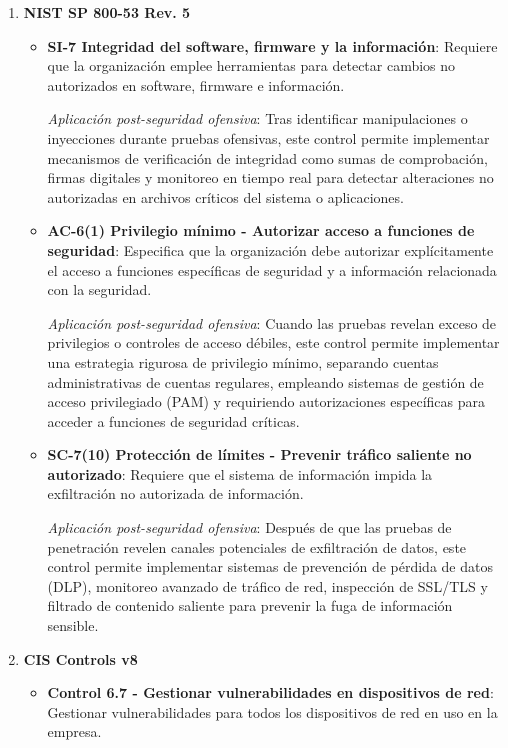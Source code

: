 {\begin{enumerate}
    \item \textbf{NIST SP 800-53 Rev. 5}
    \begin{itemize}
        \item \textbf{SI-7 Integridad del software, firmware y la información}: Requiere que la organización emplee herramientas para detectar cambios no autorizados en software, firmware e información.
        
        \textit{Aplicación post-seguridad ofensiva}: Tras identificar manipulaciones o inyecciones durante pruebas ofensivas, este control permite implementar mecanismos de verificación de integridad como sumas de comprobación, firmas digitales y monitoreo en tiempo real para detectar alteraciones no autorizadas en archivos críticos del sistema o aplicaciones.
        
        \item \textbf{AC-6(1) Privilegio mínimo - Autorizar acceso a funciones de seguridad}: Especifica que la organización debe autorizar explícitamente el acceso a funciones específicas de seguridad y a información relacionada con la seguridad.
        
        \textit{Aplicación post-seguridad ofensiva}: Cuando las pruebas revelan exceso de privilegios o controles de acceso débiles, este control permite implementar una estrategia rigurosa de privilegio mínimo, separando cuentas administrativas de cuentas regulares, empleando sistemas de gestión de acceso privilegiado (PAM) y requiriendo autorizaciones específicas para acceder a funciones de seguridad críticas.
        
        \item \textbf{SC-7(10) Protección de límites - Prevenir tráfico saliente no autorizado}: Requiere que el sistema de información impida la exfiltración no autorizada de información.
        
        \textit{Aplicación post-seguridad ofensiva}: Después de que las pruebas de penetración revelen canales potenciales de exfiltración de datos, este control permite implementar sistemas de prevención de pérdida de datos (DLP), monitoreo avanzado de tráfico de red, inspección de SSL/TLS y filtrado de contenido saliente para prevenir la fuga de información sensible.
    \end{itemize}

    \item \textbf{CIS Controls v8}
    \begin{itemize}
        \item \textbf{Control 6.7 - Gestionar vulnerabilidades en dispositivos de red}: Gestionar vulnerabilidades para todos los dispositivos de red en uso en la empresa.
        

\end{itemize}
\end{enumerate}}
